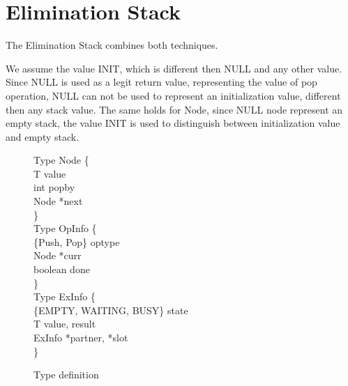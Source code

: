 \section{Elimination Stack}

The Elimination Stack combines both techniques.

We assume the value INIT, which is different then NULL and any other value. Since NULL is used as a legit return value, representing the value of pop operation, NULL can not be used to represent an initialization value, different then any stack value. The same holds for Node, since NULL node represent an empty stack, the value INIT is used to distinguish between initialization value and empty stack.


\begin{figure*}[b]
	
	
	Type Node \{ \\
		\hspace*{6mm} T value \\
		\hspace*{6mm} int popby \\
		\hspace*{6mm} Node *next \\
	\} \\
	
	
	Type OpInfo \{ \\
		\hspace*{6mm} \{Push, Pop\} optype \\
		\hspace*{6mm} Node *curr \\
		\hspace*{6mm} boolean done \\
	\} \\
	
	
	Type ExInfo \{ \\
	\hspace*{6mm} \{EMPTY, WAITING, BUSY\} state \\
	\hspace*{6mm} T value, result \\
	\hspace*{6mm} ExInfo *partner, *slot \\
	\}
	
	\caption{Type definition}
\end{figure*}



